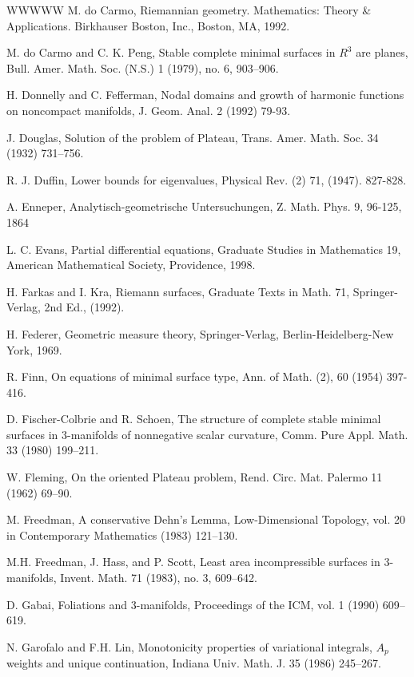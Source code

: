 \begin{thebibliography}{WWWWW}
 M. do Carmo, Riemannian geometry. Mathematics: Theory \& Applications. Birkhauser Boston, Inc., Boston, MA, 1992.

 M. do Carmo and C. K. Peng, Stable complete minimal surfaces in $R^{3}$ are planes, Bull. Amer. Math. Soc. (N.S.) 1 (1979), no. 6, 903–906.

 H. Donnelly and C. Fefferman, Nodal domains and growth of harmonic functions on noncompact manifolds, J. Geom. Anal. 2 (1992) 79-93.

 J. Douglas, Solution of the problem of Plateau, Trans. Amer. Math. Soc. 34 (1932) 731–756.

 R. J. Duffin, Lower bounds for eigenvalues, Physical Rev. (2) 71, (1947). 827-828.

 A. Enneper, Analytisch-geometrische Untersuchungen, Z. Math. Phys. 9, 96-125, 1864

 L. C. Evans, Partial differential equations, Graduate Studies in Mathematics 19, American Mathematical Society, Providence, 1998.

 H. Farkas and I. Kra, Riemann surfaces, Graduate Texts in Math. 71, Springer-Verlag, 2nd Ed., (1992).

 H. Federer, Geometric measure theory, Springer-Verlag, Berlin-Heidelberg-New York, 1969.

 R. Finn, On equations of minimal surface type, Ann. of Math. (2), 60 (1954) 397-416.

 D. Fischer-Colbrie and R. Schoen, The structure of complete stable minimal surfaces in 3-manifolds of nonnegative scalar curvature, Comm. Pure Appl. Math. 33 (1980) 199–211.

 W. Fleming, On the oriented Plateau problem, Rend. Circ. Mat. Palermo 11 (1962) 69–90.

 M. Freedman, A conservative Dehn's Lemma, Low-Dimensional Topology, vol. 20 in Contemporary Mathematics (1983) 121–130.

 M.H. Freedman, J. Hass, and P. Scott, Least area incompressible surfaces in 3-manifolds, Invent. Math. 71 (1983), no. 3, 609–642.

 D. Gabai, Foliations and 3-manifolds, Proceedings of the ICM, vol. 1 (1990) 609–619.

 N. Garofalo and F.H. Lin, Monotonicity properties of variational integrals, $A_{p}$ weights and unique continuation, Indiana Univ. Math. J. 35 (1986) 245–267.


\end{thebibliography}
